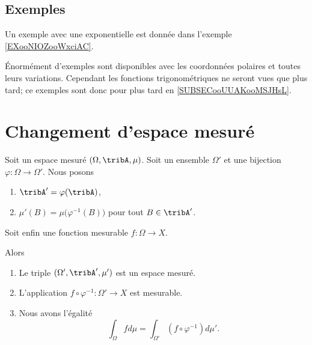 \subsection{Exemples}

Un exemple avec une exponentielle est donnée dans l'exemple \ref{EXooNIOZooWxciAC}.

Énormément d'exemples sont disponibles avec les coordonnées polaires et toutes leurs variations. Cependant les fonctions trigonométriques ne seront vues que plus tard; ce exemples sont donc pour plus tard en \ref{SUBSECooUUAKooMSJHsL}.

\section{Changement d'espace mesuré}

\begin{proposition}      \label{PROPooILOEooBiumKD}
    Soit un espace mesuré \( (\Omega,\tribA,\mu)\). Soit un ensemble \( \Omega'\) et une bijection \( \varphi\colon \Omega\to \Omega'\). Nous posons
    \begin{enumerate}
        \item
            \( \tribA'=\varphi(\tribA)\),
        \item
            \( \mu'(B)=\mu\big( \varphi^{-1}(B) \big)\) pour tout \( B\in\tribA'\).
    \end{enumerate}
    Soit enfin une fonction mesurable \( f\colon \Omega\to X\).

    Alors
    \begin{enumerate}
        \item
            Le triple \( (\Omega',\tribA',\mu')\) est un espace mesuré.
        \item
            L'application \( f\circ\varphi^{-1}\colon \Omega'\to X\) est mesurable.
        \item
            Nous avons l'égalité
            \begin{equation}
                \int_{\Omega}fd\mu=\int_{\Omega'}(f\circ\varphi^{-1})d\mu'.
            \end{equation}
    \end{enumerate}
\end{proposition}

